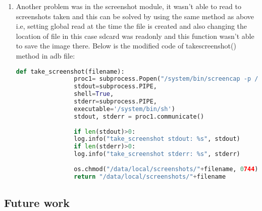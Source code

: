 \documentclass[../main.tex]{subfile}
\begin{document}
\begin{enumerate}
\begin{lstlisting}[language=python]
			# Parse the analysis configuration file generated by the agent.
			self.config = Config(cfg="analysis.conf")
			
			# We update the target according to its category. If it's a file, then
			# we store the path.
			if self.config.category == "file":
			self.target = os.path.join("/data/local/tmp", str(self.config.file_name))
			shutil.copyfile("config/hooks.json", "/data/local/tmp/hooks.json")
			os.chmod("/data/local/tmp/hooks.json", 0754) # Give set global read flag on hooks.json
			# If it's a URL, well.. we store the URL.
			else:
			self.target = self.config.target
		\end{lstlisting}
		
		\item Another problem was in the screenshot module, it wasn't able to read to screenshots taken and this can be solved by using the same method as above i.e, setting global read at the time the file is created and also changing the location of file in this case sdcard was readonly and this function wasn't able to save the image there. Below is the modified code of take\textunderscore screenshot() method in adb file:
		\begin{lstlisting}[language=python]
			def take_screenshot(filename):
				proc1= subprocess.Popen("/system/bin/screencap -p /data/local/screenshots/"+filename, # "/data/local/screenshots/" Fix for /sdcard read only
				stdout=subprocess.PIPE,
				shell=True,
				stderr=subprocess.PIPE,
				executable='/system/bin/sh')
				stdout, stderr = proc1.communicate()
				
				if len(stdout)>0:
				log.info("take_screenshot stdout: %s", stdout)
				if len(stderr)>0:
				log.info("take_screenshot stderr: %s", stderr)
				
				os.chmod("/data/local/screenshots/"+filename, 0744)
				return "/data/local/screenshots/"+filename
		\end{lstlisting}
		
		\end{enumerate}
		
		\subsection{Future work}
\end{document}
